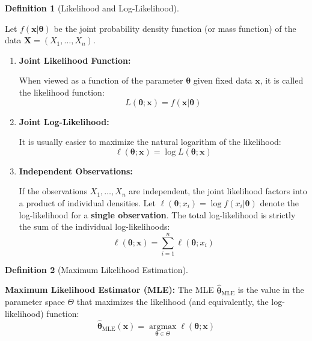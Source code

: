 \documentclass[
  letterpaper,
  DIV=11,
  numbers=noendperiod]{scrreprt}
\renewcommand{\[}{\begin{equation}}
\renewcommand{\]}{\end{equation}}
\theoremstyle{definition}
\newtheorem{definition}{Definition}[chapter]
\theoremstyle{plain}
\theoremstyle{plain}
\theoremstyle{plain}
\theoremstyle{definition}
\theoremstyle{plain}
\theoremstyle{remark}
\begin{document}
\begin{definition}[Likelihood and
Log-Likelihood]\protect\hypertarget{def-likelihood}{}\label{def-likelihood}

Let \(f(\mathbf{x}|\boldsymbol{\theta})\) be the joint probability
density function (or mass function) of the data
\(\mathbf{X} = (X_1, \dots, X_n)\).

\begin{enumerate}
\def\labelenumi{\arabic{enumi}.}
\item
  \textbf{Joint Likelihood Function:}

  When viewed as a function of the parameter \(\boldsymbol{\theta}\)
  given fixed data \(\mathbf{x}\), it is called the likelihood function:
  \[
  L(\boldsymbol{\theta}; \mathbf{x}) = f(\mathbf{x}|\boldsymbol{\theta})
  \]
\item
  \textbf{Joint Log-Likelihood:}

  It is usually easier to maximize the natural logarithm of the
  likelihood: \[
  \ell(\boldsymbol{\theta}; \mathbf{x}) = \log L(\boldsymbol{\theta}; \mathbf{x})
  \]
\item
  \textbf{Independent Observations:}

  If the observations \(X_1, \dots, X_n\) are independent, the joint
  likelihood factors into a product of individual densities. Let
  \(\ell(\boldsymbol{\theta}; x_i) = \log f(x_i|\boldsymbol{\theta})\)
  denote the log-likelihood for a \textbf{single observation}. The total
  log-likelihood is strictly the sum of the individual log-likelihoods:
  \[
  \ell(\boldsymbol{\theta}; \mathbf{x}) = \sum_{i=1}^n \ell(\boldsymbol{\theta}; x_i)
  \]
\end{enumerate}

\end{definition}

\begin{definition}[Maximum Likelihood
Estimation]\protect\hypertarget{def-mle}{}\label{def-mle}

\textbf{Maximum Likelihood Estimator (MLE):} The MLE
\(\hat{\boldsymbol{\theta}}_{\text{MLE}}\) is the value in the parameter
space \(\Theta\) that maximizes the likelihood (and equivalently, the
log-likelihood) function: \[
\hat{\boldsymbol{\theta}}_{\text{MLE}}(\mathbf{x}) = \operatorname*{argmax}_{\boldsymbol{\theta} \in \Theta} \ell(\boldsymbol{\theta}; \mathbf{x})
\]

\end{definition}
\end{document}
